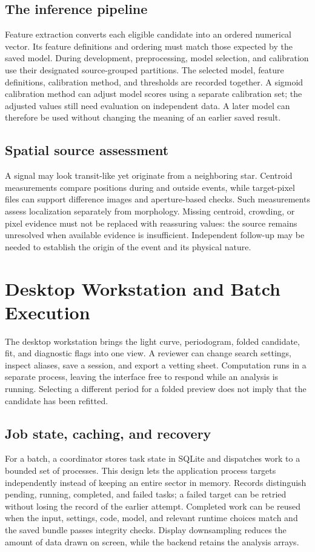 \documentclass[11pt,a4paper]{article}
\begin{document}
\subsection{The inference pipeline}
Feature extraction converts each eligible candidate into an ordered numerical vector. Its feature definitions and ordering must match those expected by the saved model. During development, preprocessing, model selection, and calibration use their designated source-grouped partitions. The selected model, feature definitions, calibration method, and thresholds are recorded together. A sigmoid calibration method can adjust model scores using a separate calibration set; the adjusted values still need evaluation on independent data. A later model can therefore be used without changing the meaning of an earlier saved result.

\subsection{Spatial source assessment}
A signal may look transit-like yet originate from a neighboring star. Centroid measurements compare positions during and outside events, while target-pixel files can support difference images and aperture-based checks. Such measurements assess localization separately from morphology. Missing centroid, crowding, or pixel evidence must not be replaced with reassuring values: the source remains unresolved when available evidence is insufficient. Independent follow-up may be needed to establish the origin of the event and its physical nature.

\section{Desktop Workstation and Batch Execution}
The desktop workstation brings the light curve, periodogram, folded candidate, fit, and diagnostic flags into one view. A reviewer can change search settings, inspect aliases, save a session, and export a vetting sheet. Computation runs in a separate process, leaving the interface free to respond while an analysis is running. Selecting a different period for a folded preview does not imply that the candidate has been refitted.

\subsection{Job state, caching, and recovery}
For a batch, a coordinator stores task state in SQLite and dispatches work to a bounded set of processes. This design lets the application process targets independently instead of keeping an entire sector in memory. Records distinguish pending, running, completed, and failed tasks; a failed target can be retried without losing the record of the earlier attempt. Completed work can be reused when the input, settings, code, model, and relevant runtime choices match and the saved bundle passes integrity checks. Display downsampling reduces the amount of data drawn on screen, while the backend retains the analysis arrays.
\end{document}
